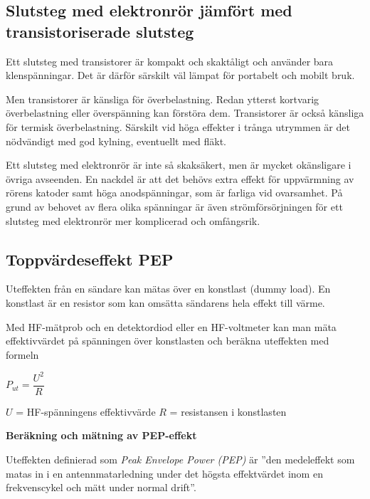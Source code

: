 \subsection{Slutsteg med elektronrör jämfört med transistoriserade slutsteg}

Ett slutsteg med transistorer är kompakt och skaktåligt och använder
bara klenspänningar.
Det är därför särskilt väl lämpat för portabelt och mobilt bruk.

Men transistorer är känsliga för överbelastning.
Redan ytterst kortvarig överbelastning eller överspänning kan förstöra dem.
Transistorer är också känsliga för termisk överbelastning.
Särskilt vid höga effekter i trånga utrymmen är det nödvändigt med god kylning,
eventuellt med fläkt.

Ett slutsteg med elektronrör är inte så skaksäkert, men är mycket okänsligare
i övriga avseenden.
En nackdel är att det behövs extra effekt för uppvärmning av rörens katoder
samt höga anodspänningar, som är farliga vid ovarsamhet.
På grund av behovet av flera olika spänningar är även strömförsörjningen för
ett slutsteg med elektronrör mer komplicerad och omfångsrik.

\subsection{Toppvärdeseffekt PEP}
\label{PEP-effekt}

Uteffekten från en sändare kan mätas över en konstlast (dummy load).
En konstlast är en resistor som kan omsätta sändarens hela effekt till värme.

Med HF-mätprob och en detektordiod eller en HF-voltmeter kan man mäta
effektivvärdet på spänningen över konstlasten och beräkna uteffekten med
formeln

\(P_{ut} = \dfrac{U^2}{R}\)

\(U\) = HF-spänningens effektivvärde
\(R\) = resistansen i konstlasten

\textbf{Beräkning och mätning av PEP-effekt}

Uteffekten definierad som \emph{Peak Envelope Power (PEP)} %
\cite{ITU-RR}
är ''den medeleffekt som matas in i en antennmatarledning under det högsta
effektvärdet inom en frekvenscykel och mätt under normal drift''.

